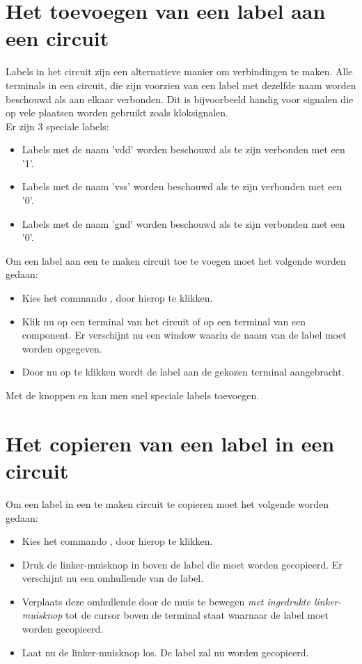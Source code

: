\section{Het toevoegen van een label aan een circuit}
Labels in het circuit zijn een alternatieve manier om verbindingen
te maken. Alle terminals in een circuit, die zijn voorzien van een label
met dezelfde naam worden beschouwd als aan elkaar verbonden.
Dit is bijvoorbeeld handig voor signalen die op vele plaatsen worden gebruikt
zoals kloksignalen.\\
Er zijn 3 speciale labels:
\begin{itemize}
\item Labels met de naam 'vdd' worden beschouwd als te zijn verbonden met een '1'.
\item Labels met de naam 'vss' worden beschouwd als te zijn verbonden met een '0'.
\item Labels met de naam 'gnd' worden beschouwd als te zijn verbonden met een '0'.
\end{itemize}
Om een label aan een te maken circuit toe te voegen moet het volgende
worden gedaan:
\begin{itemize}
\item Kies het commando , door hierop te klikken.
\item Klik nu op een terminal van het circuit of op een terminal van een
      component. Er verschijnt nu een window waarin de naam van de label
      moet worden opgegeven.
\item Door nu op  te klikken wordt de label aan de gekozen terminal
      aangebracht.
\end{itemize}
Met de knoppen  en  kan men snel speciale labels toevoegen.

\section{Het copieren van een label in een circuit}
Om een label in een te maken circuit te copieren moet het volgende
worden gedaan:
\begin{itemize}
\item Kies het commando , door hierop te klikken.
\item Druk de linker-muisknop in boven de label die moet worden gecopieerd.
      Er verschijnt nu een omhullende van de label.
\item Verplaats deze omhullende door de muis te bewegen {\it met ingedrukte
      linker-muisknop} tot de cursor boven de terminal staat waarnaar de
      label moet worden gecopieerd.
\item Laat nu de linker-muisknop los. De label zal nu worden gecopieerd.
\end{itemize}

